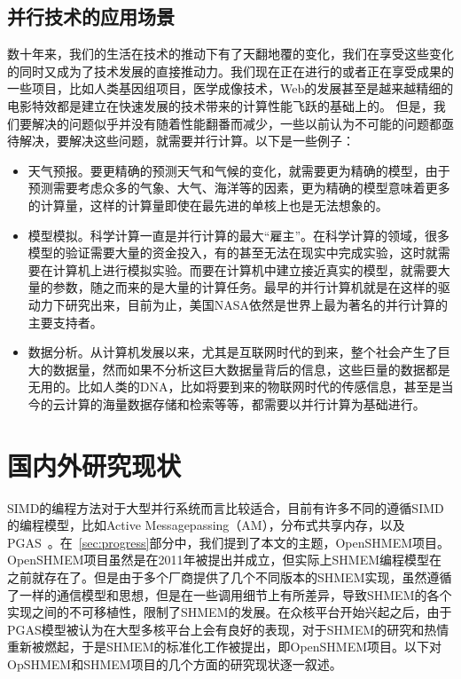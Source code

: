 \subsection{并行技术的应用场景} 
数十年来，我们的生活在技术的推动下有了天翻地覆的变化，我们在享受这些变化的同时又成为了技术发展的直接推动力。我们现在正在进行的或者正在享受成果的一些项目，比如人类基因组项目，医学成像技术，Web的发展甚至是越来越精细的电影特效都是建立在快速发展的技术带来的计算性能飞跃的基础上的。 但是，我们要解决的问题似乎并没有随着性能翻番而减少，一些以前认为不可能的问题都亟待解决，要解决这些问题，就需要并行计算。以下是一些例子：
\begin{itemize}
\item 天气预报。要更精确的预测天气和气候的变化，就需要更为精确的模型，由于预测需要考虑众多的气象、大气、海洋等的因素，更为精确的模型意味着更多的计算量，这样的计算量即使在最先进的单核上也是无法想象的。
\item 模型模拟。科学计算一直是并行计算的最大“雇主”。在科学计算的领域，很多模型的验证需要大量的资金投入，有的甚至无法在现实中完成实验，这时就需要在计算机上进行模拟实验。而要在计算机中建立接近真实的模型，就需要大量的参数，随之而来的是大量的计算任务。最早的并行计算机就是在这样的驱动力下研究出来，目前为止，美国NASA依然是世界上最为著名的并行计算的主要支持者。
\item 数据分析。从计算机发展以来，尤其是互联网时代的到来，整个社会产生了巨大的数据量，然而如果不分析这巨大数据量背后的信息，这些巨量的数据都是无用的。比如人类的DNA，比如将要到来的物联网时代的传感信息，甚至是当今的云计算的海量数据存储和检索等等，都需要以并行计算为基础进行。
\end{itemize}
\section{国内外研究现状}
SIMD的编程方法对于大型并行系统而言比较适合，目前有许多不同的遵循SIMD的编程模型，比如Active Messagepassing（AM），分布式共享内存，以及PGAS~\cite{jour:tshmem}。在~\ref{sec:progress}部分中，我们提到了本文的主题，OpenSHMEM项目。OpenSHMEM项目虽然是在2011年被提出并成立，但实际上SHMEM编程模型在之前就存在了\cite{site:openshmem_spec}\cite{site:shmem_api}\cite{book:encyclopedia_of_parallel_computing}。但是由于多个厂商提供了几个不同版本的SHMEM实现，虽然遵循了一样的通信模型和思想，但是在一些调用细节上有所差异，导致SHMEM的各个实现之间的不可移植性，限制了SHMEM的发展。在众核平台开始兴起之后，由于PGAS模型被认为在大型多核平台上会有良好的表现，对于SHMEM的研究和热情重新被燃起，于是SHMEM的标准化工作被提出，即OpenSHMEM项目。以下对OpSHMEM和SHMEM项目的几个方面的研究现状逐一叙述。
